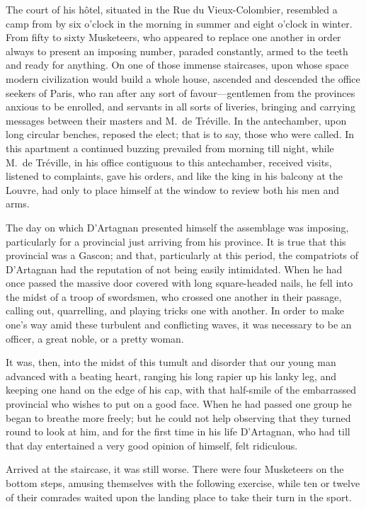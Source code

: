 The court of his hôtel, situated in the Rue du Vieux-Colombier, resembled a camp from by six o'clock in the morning in summer and eight o'clock in winter. From fifty to sixty Musketeers, who appeared to replace one another in order always to present an imposing number, paraded constantly, armed to the teeth and ready for anything. On one of those immense staircases, upon whose space modern civilization would build a whole house, ascended and descended the office seekers of Paris, who ran after any sort of favour—gentlemen from the provinces anxious to be enrolled, and servants in all sorts of liveries, bringing and carrying messages between their masters and M.~de Tréville. In the antechamber, upon long circular benches, reposed the elect; that is to say, those who were called. In this apartment a continued buzzing prevailed from morning till night, while M.~de Tréville, in his office contiguous to this antechamber, received visits, listened to complaints, gave his orders, and like the king in his balcony at the Louvre, had only to place himself at the window to review both his men and arms. 

The day on which D'Artagnan presented himself the assemblage was imposing, particularly for a provincial just arriving from his province. It is true that this provincial was a Gascon; and that, particularly at this period, the compatriots of D'Artagnan had the reputation of not being easily intimidated. When he had once passed the massive door covered with long square-headed nails, he fell into the midst of a troop of swordsmen, who crossed one another in their passage, calling out, quarrelling, and playing tricks one with another. In order to make one's way amid these turbulent and conflicting waves, it was necessary to be an officer, a great noble, or a pretty woman. 

It was, then, into the midst of this tumult and disorder that our young man advanced with a beating heart, ranging his long rapier up his lanky leg, and keeping one hand on the edge of his cap, with that half-smile of the embarrassed provincial who wishes to put on a good face. When he had passed one group he began to breathe more freely; but he could not help observing that they turned round to look at him, and for the first time in his life D'Artagnan, who had till that day entertained a very good opinion of himself, felt ridiculous. 

Arrived at the staircase, it was still worse. There were four Musketeers on the bottom steps, amusing themselves with the following exercise, while ten or twelve of their comrades waited upon the landing place to take their turn in the sport. 

